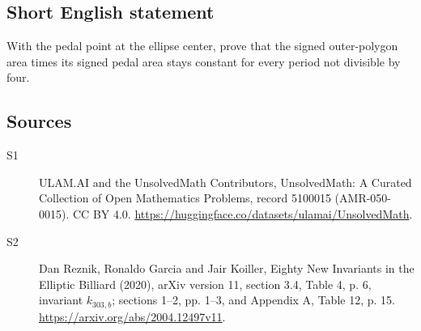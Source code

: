 \documentclass[11pt]{article}
\begin{document}
\subsection{Short English statement}
With the pedal point at the ellipse center, prove that the signed outer-polygon area times its signed pedal area stays constant for every period not divisible by four.
\subsection{Sources}
\begin{description}
\item[\hypertarget{source:5100015:1}{S1}] ULAM.AI and the UnsolvedMath Contributors, UnsolvedMath: A Curated Collection of Open Mathematics Problems, record 5100015 (AMR-050-0015). CC BY 4.0. \url{https://huggingface.co/datasets/ulamai/UnsolvedMath}.
\item[\hypertarget{source:5100015:2}{S2}] Dan Reznik, Ronaldo Garcia and Jair Koiller, Eighty New Invariants in the Elliptic Billiard (2020), arXiv version 11, section 3.4, Table 4, p. 6, invariant $k_{303,b}$; sections 1--2, pp. 1--3, and Appendix A, Table 12, p. 15. \url{https://arxiv.org/abs/2004.12497v11}.
\end{description}
\label{end:5100015}
\end{document}
